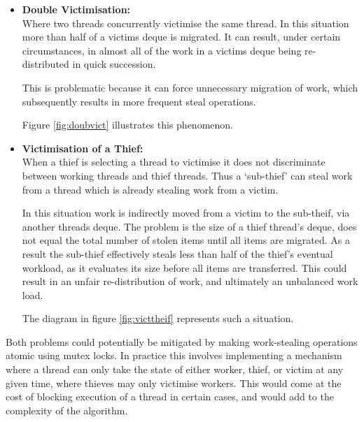 \begin{itemize}
\item \textbf{Double Victimisation:} \\
        Where two threads concurrently victimise the same thread.
        In this situation more than half of a victims deque is migrated.
        It can result, under certain circumstances,
        in almost all of the work in a victims deque being re-distributed in quick succession. 
        
        This is problematic because it can force unnecessary migration of work, which subsequently results 
        in more frequent steal operations.
        
        Figure \ref{fig:doubvict} illustrates this phenomenon.
\item \textbf{Victimisation of a Thief:} \\
        When a thief is selecting a thread to victimise it does not discriminate between working threads 
        and thief threads. Thus a `sub-thief' can steal work from a thread which is already stealing work from a 
        victim.
        
        In this situation work is indirectly moved from a victim to the sub-theif, via 
        another threads deque. The problem is the size of a thief thread's deque, does not equal 
        the total number of stolen items until all items are migrated. As a result the sub-thief 
        effectively steals less than half of the thief's eventual workload, as it evaluates its size
        before all items are transferred. 
        This could result in an unfair re-distribution of work, and ultimately an unbalanced work load.
        
        The diagram in figure \ref{fig:victtheif} represents such a situation.
\end{itemize}

Both problems could potentially be mitigated by making work-stealing operations atomic using mutex locks. 
In practice this involves implementing a mechanism where a thread can only take the state of either worker, thief, or victim
at any given time, where thieves may only victimise workers. 
This would come at the cost of blocking execution of a thread in certain cases, and would add to the complexity of the algorithm.





